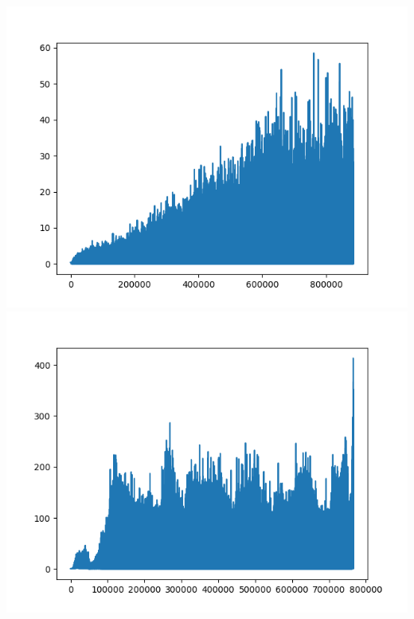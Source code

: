 \documentclass[12pt]{article}
\begin{document}
\begin{solution}
\includegraphics[scale=0.5]{Completed_Graphs/Cartpole_Single_Loss.png}\\
\includegraphics[scale=0.5]{Completed_Graphs/Cartpole_Double_Loss.png}\\


\end{solution}
\end{document}
